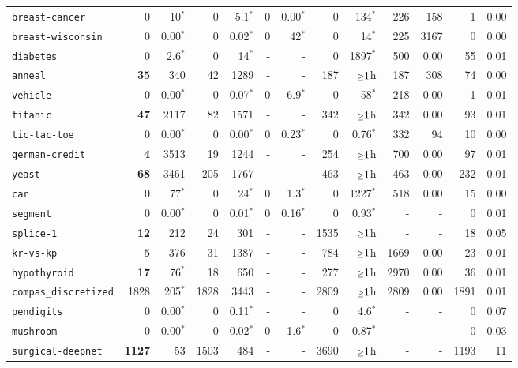 \begin{tabular}{lrrrrrrrrrrrr}
\texttt{breast-cancer} & 0 & 10$^*$ & 0 & 5.1$^*$ & 0 & 0.00$^*$ & 0 & 134$^*$ & 226 & 158 & 1 & 0.00\\
\texttt{breast-wisconsin} & 0 & 0.00$^*$ & 0 & 0.02$^*$ & 0 & 42$^*$ & 0 & 14$^*$ & 225 & 3167 & 0 & 0.00\\
\texttt{diabetes} & 0 & 2.6$^*$ & 0 & 14$^*$ & - & - & 0 & 1897$^*$ & 500 & 0.00 & 55 & 0.01\\
\texttt{anneal} & \textbf{35} & 340 & 42 & 1289 & - & - & 187 & $\mathsmaller{\geq}1$h & 187 & 308 & 74 & 0.00\\
\texttt{vehicle} & 0 & 0.00$^*$ & 0 & 0.07$^*$ & 0 & 6.9$^*$ & 0 & 58$^*$ & 218 & 0.00 & 1 & 0.01\\
\texttt{titanic} & \textbf{47} & 2117 & 82 & 1571 & - & - & 342 & $\mathsmaller{\geq}1$h & 342 & 0.00 & 93 & 0.01\\
\texttt{tic-tac-toe} & 0 & 0.00$^*$ & 0 & 0.00$^*$ & 0 & 0.23$^*$ & 0 & 0.76$^*$ & 332 & 94 & 10 & 0.00\\
\texttt{german-credit} & \textbf{4} & 3513 & 19 & 1244 & - & - & 254 & $\mathsmaller{\geq}1$h & 700 & 0.00 & 97 & 0.01\\
\texttt{yeast} & \textbf{68} & 3461 & 205 & 1767 & - & - & 463 & $\mathsmaller{\geq}1$h & 463 & 0.00 & 232 & 0.01\\
\texttt{car} & 0 & 77$^*$ & 0 & 24$^*$ & 0 & 1.3$^*$ & 0 & 1227$^*$ & 518 & 0.00 & 15 & 0.00\\
\texttt{segment} & 0 & 0.00$^*$ & 0 & 0.01$^*$ & 0 & 0.16$^*$ & 0 & 0.93$^*$ & - & - & 0 & 0.01\\
\texttt{splice-1} & \textbf{12} & 212 & 24 & 301 & - & - & 1535 & $\mathsmaller{\geq}1$h & - & - & 18 & 0.05\\
\texttt{kr-vs-kp} & \textbf{5} & 376 & 31 & 1387 & - & - & 784 & $\mathsmaller{\geq}1$h & 1669 & 0.00 & 23 & 0.01\\
\texttt{hypothyroid} & \textbf{17} & 76$^*$ & 18 & 650 & - & - & 277 & $\mathsmaller{\geq}1$h & 2970 & 0.00 & 36 & 0.01\\
\texttt{compas\_discretized} & 1828 & 205$^*$ & 1828 & 3443 & - & - & 2809 & $\mathsmaller{\geq}1$h & 2809 & 0.00 & 1891 & 0.01\\
\texttt{pendigits} & 0 & 0.00$^*$ & 0 & 0.11$^*$ & - & - & 0 & 4.6$^*$ & - & - & 0 & 0.07\\
\texttt{mushroom} & 0 & 0.00$^*$ & 0 & 0.02$^*$ & 0 & 1.6$^*$ & 0 & 0.87$^*$ & - & - & 0 & 0.03\\
\texttt{surgical-deepnet} & \textbf{1127} & 53 & 1503 & 484 & - & - & 3690 & $\mathsmaller{\geq}1$h & - & - & 1193 & 11\\

\end{tabular}
